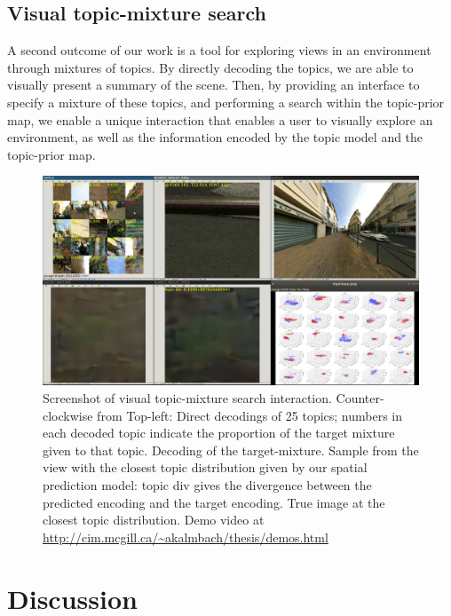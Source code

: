 \subsection{Visual topic-mixture search}
A second outcome of our work is a tool for exploring views in an environment through mixtures of topics. By directly decoding the topics, we are able to visually present a summary of the scene. Then, by providing an interface to specify a mixture of these topics, and performing a search within the topic-prior map, we enable a unique interaction that enables a user to visually explore an environment, as well as the information encoded by the topic model and the topic-prior map.

\begin{figure}
    \centering
    \includegraphics[width=\textwidth]{figures/ptz/interaction.png}
    \caption{Screenshot of visual topic-mixture search interaction. Counter-clockwise from Top-left: Direct decodings of 25 topics; numbers in each decoded topic indicate the proportion of the target mixture given to that topic. Decoding of the target-mixture. Sample from the view with the closest topic distribution given by our spatial prediction model: topic div gives the divergence between the predicted encoding and the target encoding. True image at the closest topic distribution. Demo video at \url{http://cim.mcgill.ca/~akalmbach/thesis/demos.html}}
    \label{fig:interaction}
\end{figure}

\section{Discussion}

